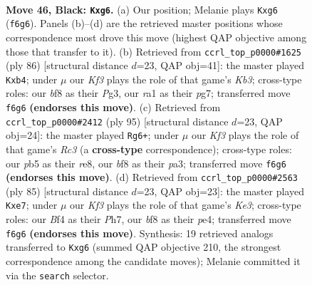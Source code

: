 \documentclass[11pt]{article}
\begin{document}
\clearpage

\begin{figure}[p]\centering
\begin{subfigure}{0.46\textwidth}\centering
\resizebox{\linewidth}{!}{%
\newchessgame
\chessboard[
  setfen={5B2/p4N2/P4kP1/1P3p2/5b2/3K4/8/R7 b - - 2 46},
  showmover=false,
  pgfstyle=straightmove, color=movearrow, markmove={f6-g6}
]}
\caption{}
\end{subfigure}\hfill
\begin{subfigure}{0.46\textwidth}\centering
\resizebox{\linewidth}{!}{%
\newchessgame
\chessboard[
  setfen={8/1p4pB/2pk4/8/Pp1P4/1Kn3PP/8/8 w - - 1 44},
  showmover=false,
  pgfstyle=straightmove, color=movearrow, markmove={b3-b4}
]}
\caption{}
\end{subfigure}
\\[4pt]
\begin{subfigure}{0.46\textwidth}\centering
\resizebox{\linewidth}{!}{%
\newchessgame
\chessboard[
  setfen={4R3/8/p1r5/2N2b1p/1P6/P1k3K1/6P1/8 b - - 7 48},
  showmover=false,
  pgfstyle=straightmove, color=movearrow, markmove={c6-g6}
]}
\caption{}
\end{subfigure}\hfill
\begin{subfigure}{0.46\textwidth}\centering
\resizebox{\linewidth}{!}{%
\newchessgame
\chessboard[
  setfen={8/4N2p/4k3/4p1p1/1P2P3/5PK1/3Bb3/8 b - - 0 43},
  showmover=false,
  pgfstyle=straightmove, color=movearrow, markmove={e6-e7}
]}
\caption{}
\end{subfigure}
\caption{\textbf{Move 46, Black: \texttt{Kxg6}.} (a) Our position; Melanie plays \texttt{Kxg6} (\texttt{f6g6}). Panels (b)--(d) are the retrieved master positions whose correspondence most drove this move (highest QAP objective among those that transfer to it). (b) Retrieved from \texttt{ccrl\_top\_p0000\#1625} (ply 86) [structural distance $d$=23, QAP obj=41]: the master played \texttt{Kxb4}; under $\mu$ our \emph{Kf3} plays the role of that game's \emph{Kb3}; cross-type roles: our \emph{b}f8 as their \emph{P}g3, our \emph{r}a1 as their \emph{p}g7; transferred move \texttt{f6g6} \textbf{(endorses this move)}. (c) Retrieved from \texttt{ccrl\_top\_p0000\#2412} (ply 95) [structural distance $d$=23, QAP obj=24]: the master played \texttt{Rg6+}; under $\mu$ our \emph{Kf3} plays the role of that game's \emph{Rc3} (a \textbf{cross-type} correspondence); cross-type roles: our \emph{p}b5 as their \emph{r}e8, our \emph{b}f8 as their \emph{p}a3; transferred move \texttt{f6g6} \textbf{(endorses this move)}. (d) Retrieved from \texttt{ccrl\_top\_p0000\#2563} (ply 85) [structural distance $d$=23, QAP obj=23]: the master played \texttt{Kxe7}; under $\mu$ our \emph{Kf3} plays the role of that game's \emph{Ke3}; cross-type roles: our \emph{B}f4 as their \emph{P}h7, our \emph{b}f8 as their \emph{p}e4; transferred move \texttt{f6g6} \textbf{(endorses this move)}. Synthesis: 19 retrieved analogs transferred to \texttt{Kxg6} (summed QAP objective 210, the strongest correspondence among the candidate moves); Melanie committed it via the \texttt{search} selector.}
\label{fig:thought-m91}
\end{figure}
\end{document}
